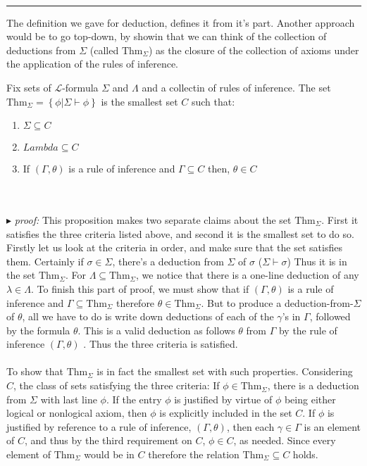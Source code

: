 \documentclass[9pt,a4paper]{article}
\newcommand{\curveL}{\mathcal{L}}
\newcommand{\thm}{\text{Thm}}
\newcommand{\proof}{\ \\ \ \\ $\blacktriangleright$ \textit{proof: }}
\newcommand{\distinct}{ \\ \hrule}
\begin{document}
     \distinct
     The definition we gave for deduction, defines it from it's part. Another approach would be to go top-down, by showin that we can think of the collection of deductions from $\Sigma$ (called $\thm_\Sigma$) as the closure of the collection of axioms under the application of the rules of inference.
     \begin{proposition}
          Fix sets of $\curveL$-formula $\Sigma$ and $\Lambda$ and a collectin of rules of inference. The set $\thm_\Sigma = \left\{ \phi | \Sigma\vdash\phi\right\}$ is the smallest set $C$ such that:
          \begin{enumerate}
               \item $\Sigma \subseteq C$
               \item $Lambda \subseteq C$
               \item If $(\Gamma, \theta)$ is a rule of inference and $\Gamma\subseteq C$ then, $\theta \in C$
          \end{enumerate}
          \
          \proof This proposition makes two separate claims about the set $\thm_\Sigma$. First it satisfies the three criteria listed above, and second it is the smallest set to do so. Firstly let us look at the criteria in order, and make sure that the set satisfies them.  Certainly if $\sigma\in\Sigma$, there's a deduction from $\Sigma$ of $\sigma$ ($\Sigma\vdash\sigma$) Thus it is in the set $\thm_\Sigma$. For $\Lambda\subseteq \thm_\Sigma$, we notice that there is a one-line deduction of any $\lambda\in\Lambda$. To finish this part of proof, we must show that if $(\Gamma,\theta)$ is a rule of inference and $\Gamma\subseteq\thm_\Sigma$ therefore $\theta\in \thm_\Sigma$. But to produce a deduction-from-$\Sigma$ of $\theta$, all we have to do is write down deductions of each of the $\gamma$'s in $\Gamma$, followed by the formula $\theta$. This is a valid deduction as follows $\theta$ from $\Gamma$ by the rule of inference $(\Gamma, \theta)$ . Thus the three criteria is satisfied.
          \\
          \\
          To show that $\thm_\Sigma$ is in fact the smallest set with such properties. Considering $C$, the class of sets satisfying the three criteria: If $\phi \in \thm_\Sigma$, there is a deduction from $\Sigma$ with last line $\phi$. If the entry $\phi$ is justified by virtue of $\phi$ being either logical or nonlogical axiom, then $\phi$ is explicitly included in the set $C$. If $\phi$ is justified by reference to a rule of inference, $(\Gamma, \theta)$, then each $\gamma\in\Gamma$ is an element of $C$, and thus by the third requirement on $C$, $\phi\in C$, as needed.
          Since every element of $\thm_\Sigma$ would be in $C$ therefore the relation $\thm_\Sigma\subseteq C$ holds.
     \end{proposition}
\end{document}
